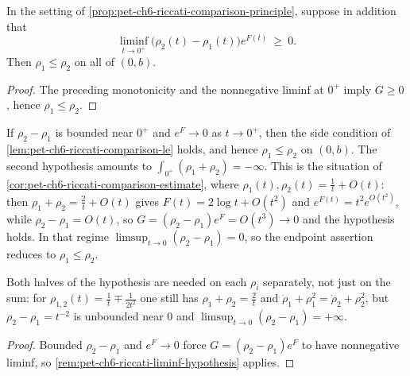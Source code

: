 \begin{lemma}
  \label{lem:pet-ch6-riccati-comparison-le}
  \leanok
  In the setting of \cref{prop:pet-ch6-riccati-comparison-principle}, suppose in
  addition that
  \[
    \liminf_{t\to0^+}\big(\rho_2(t)-\rho_1(t)\big)e^{F(t)}\ \ge\ 0 .
  \]
  Then $\rho_1\le\rho_2$ on all of $(0,b)$.
\end{lemma}
\begin{proof}
  \leanok
  \sketch
  The preceding monotonicity and the nonnegative liminf at \(0^+\) imply \(G\ge0\), hence \(\rho_1\le\rho_2\).
\end{proof}

\begin{remark}
  \label{rem:pet-ch6-riccati-liminf-hypothesis}
  \leanok
  If $\rho_2-\rho_1$ is bounded near $0^+$ and $e^{F}\to0$ as $t\to0^+$, then the
  side condition of \cref{lem:pet-ch6-riccati-comparison-le} holds, and hence
  $\rho_1\le\rho_2$ on $(0,b)$. The second hypothesis amounts to
  $\int_{0^+}(\rho_1+\rho_2)=-\infty$. This is the situation of
  \cref{cor:pet-ch6-riccati-comparison-estimate}, where
  $\rho_1(t),\rho_2(t)=\tfrac1t+O(t)$: then $\rho_1+\rho_2=\tfrac2t+O(t)$ gives
  $F(t)=2\log t+O(t^2)$ and $e^{F(t)}=t^2e^{O(t^2)}$, while $\rho_2-\rho_1=O(t)$,
  so $G=(\rho_2-\rho_1)e^{F}=O(t^3)\to0$ and the hypothesis holds. In that regime
  $\limsup_{t\to0}(\rho_2-\rho_1)=0$, so the endpoint assertion reduces to
  $\rho_1\le\rho_2$.

  Both halves of the hypothesis are needed on each $\rho_i$ separately, not just
  on the sum: for $\rho_{1,2}(t)=\tfrac1t\mp\tfrac1{2t^2}$ one still has
  $\rho_1+\rho_2=\tfrac2t$ and $\dot\rho_1+\rho_1^2=\dot\rho_2+\rho_2^2$, but
  $\rho_2-\rho_1=t^{-2}$ is unbounded near $0$ and
  $\limsup_{t\to0}(\rho_2-\rho_1)=+\infty$.
\end{remark}
\begin{proof}
  \leanok
  \sketch
  Bounded \(\rho_2-\rho_1\) and \(e^F\to0\) force \(G=(\rho_2-\rho_1)e^F\) to have nonnegative liminf, so \cref{rem:pet-ch6-riccati-liminf-hypothesis} applies.
\end{proof}

